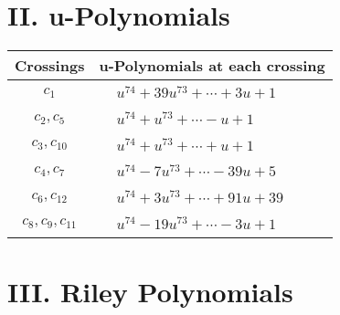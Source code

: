 \documentclass[1p]{elsarticle_modified}
\theoremstyle{definition}
\begin{document}
\newpage\renewcommand{\arraystretch}{1}
\centering \section*{ II. u-Polynomials}
\begin{tabular}{m{50pt}|m{274pt}}
Crossings & \hspace{64pt}u-Polynomials at each crossing \\
\hline $$\begin{aligned}c_{1}\end{aligned}$$&$\begin{aligned}
&u^{74}+39 u^{73}+\cdots+3 u+1
\end{aligned}$\\
\hline $$\begin{aligned}c_{2},c_{5}\end{aligned}$$&$\begin{aligned}
&u^{74}+u^{73}+\cdots- u+1
\end{aligned}$\\
\hline $$\begin{aligned}c_{3},c_{10}\end{aligned}$$&$\begin{aligned}
&u^{74}+u^{73}+\cdots+u+1
\end{aligned}$\\
\hline $$\begin{aligned}c_{4},c_{7}\end{aligned}$$&$\begin{aligned}
&u^{74}-7 u^{73}+\cdots-39 u+5
\end{aligned}$\\
\hline $$\begin{aligned}c_{6},c_{12}\end{aligned}$$&$\begin{aligned}
&u^{74}+3 u^{73}+\cdots+91 u+39
\end{aligned}$\\
\hline $$\begin{aligned}c_{8},c_{9},c_{11}\end{aligned}$$&$\begin{aligned}
&u^{74}-19 u^{73}+\cdots-3 u+1
\end{aligned}$\\
\hline
\end{tabular}\newpage\renewcommand{\arraystretch}{1}
\centering \section*{ III. Riley Polynomials}
\end{document}
